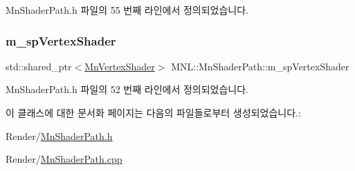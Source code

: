 Mn\+Shader\+Path.\+h 파일의 55 번째 라인에서 정의되었습니다.

\mbox{\label{class_m_n_l_1_1_mn_shader_path_a5cabf2617966090ed953812d48fb157d}} 
\subsubsection{\texorpdfstring{m\+\_\+sp\+Vertex\+Shader}{m\_spVertexShader}}
{\footnotesize\ttfamily std\+::shared\+\_\+ptr$<$\hyperlink{class_m_n_l_1_1_mn_vertex_shader}{Mn\+Vertex\+Shader}$>$ M\+N\+L\+::\+Mn\+Shader\+Path\+::m\+\_\+sp\+Vertex\+Shader\hspace{0.3cm}{\ttfamily [private]}}



Mn\+Shader\+Path.\+h 파일의 52 번째 라인에서 정의되었습니다.



이 클래스에 대한 문서화 페이지는 다음의 파일들로부터 생성되었습니다.\+:\begin{DoxyCompactItemize}
\item 
Render/\hyperlink{_mn_shader_path_8h}{Mn\+Shader\+Path.\+h}\item 
Render/\hyperlink{_mn_shader_path_8cpp}{Mn\+Shader\+Path.\+cpp}\end{DoxyCompactItemize}
